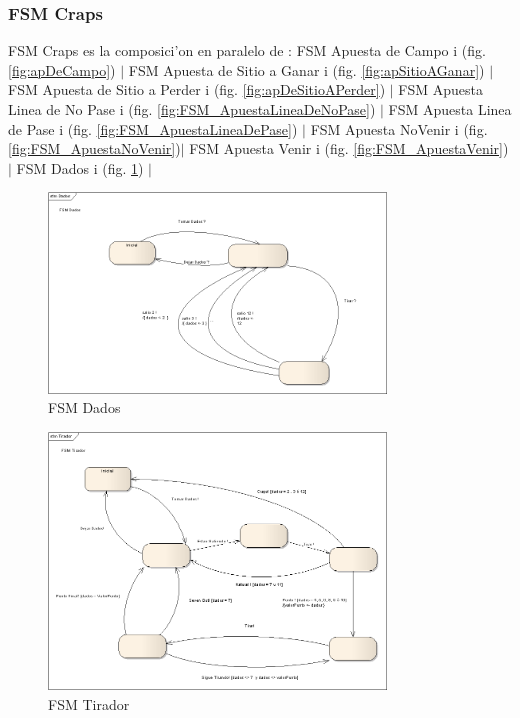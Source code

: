 	\subsubsection{FSM Craps}




FSM Craps es la composici'on en paralelo de : 
FSM Apuesta de Campo i (fig. \ref{fig:apDeCampo}) $|$ 
FSM Apuesta de Sitio a Ganar i (fig. \ref{fig:apSitioAGanar}) $|$
FSM Apuesta de Sitio a Perder i (fig. \ref{fig:apDeSitioAPerder}) $|$
FSM Apuesta Linea de No Pase i (fig. \ref{fig:FSM_ApuestaLineaDeNoPase}) $|$
FSM Apuesta Linea de Pase i (fig. \ref{fig:FSM_ApuestaLineaDePase}) $|$
FSM Apuesta NoVenir i (fig. \ref{fig:FSM_ApuestaNoVenir})$|$
FSM Apuesta Venir i (fig. \ref{fig:FSM_ApuestaVenir}) $|$
FSM Dados i (fig. \ref{fig:FSM_Dados}) $|$


        \begin{figure}[p!hbt]
		\centering
		\includegraphics[angle=0, width=0.8\textwidth]{../img/FSM_Dados.png}
		\caption{FSM Dados }
		\label{fig:FSM_Dados}
	\end{figure}

        \begin{figure}[p!hbt]
		\centering
		\includegraphics[angle=0, width=0.8\textwidth ]{../img/FSM_Tirador.png}
		\caption{FSM Tirador }
		\label{fig:fsmtirador}
	\end{figure}


